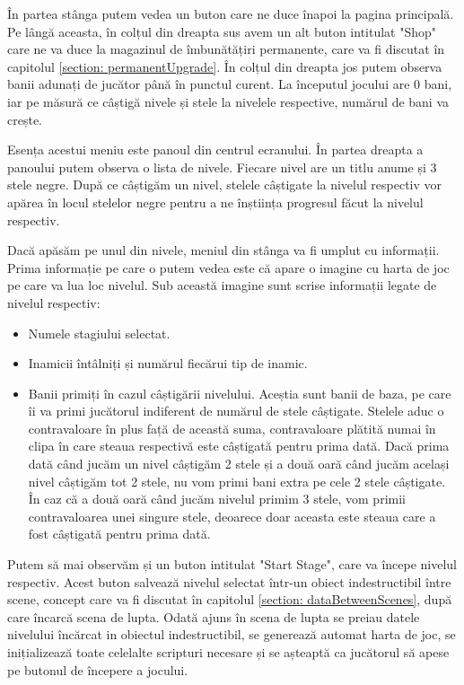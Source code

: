 \documentclass[12pt, a4paper]{article}
\begin{document}
	În partea stânga putem vedea un buton care ne duce înapoi la pagina principală. Pe lângă aceasta, în colțul din dreapta sus avem un alt buton intitulat "Shop" care ne va duce la magazinul de îmbunătățiri permanente, care va fi discutat în capitolul \ref{section: permanentUpgrade}. În colțul din dreapta jos putem observa banii adunați de jucător până în punctul curent. La începutul jocului are 0 bani, iar pe măsură ce câștigă nivele și stele la nivelele respective, numărul de bani va crește.
	\newline
	
	Esența acestui meniu este panoul din centrul ecranului. În partea dreapta a panoului putem observa o lista de nivele. Fiecare nivel are un titlu anume și 3 stele negre. După ce câștigăm un nivel, stelele câștigate la nivelul respectiv vor apărea în locul stelelor negre pentru a ne înștiința progresul făcut la nivelul respectiv.
	\newline
	
	Dacă apăsăm pe unul din nivele, meniul din stânga va fi umplut cu informații. Prima informație pe care o putem vedea este că apare o imagine cu harta de joc pe care va lua loc nivelul. Sub această imagine sunt scrise informații legate de nivelul respectiv:
	
	\begin{itemize}
		\item Numele stagiului selectat.
		\item Inamicii întâlniți și numărul fiecărui tip de inamic.
		\item Banii primiți în cazul câștigării nivelului. Aceștia sunt banii de baza, pe care îi va primi jucătorul indiferent de numărul de stele câștigate. Stelele aduc o contravaloare în plus față de această suma, contravaloare plătită numai în clipa în care steaua respectivă este câștigată pentru prima dată. Dacă prima dată când jucăm un nivel câștigăm 2 stele și a două oară când jucăm același nivel câștigăm tot 2 stele, nu vom primi bani extra pe cele 2 stele câștigate. În caz că a două oară când jucăm nivelul primim 3 stele, vom primii contravaloarea unei singure stele, deoarece doar aceasta este steaua care a fost câștigată pentru prima dată.
	\end{itemize}
	
	Putem să mai observăm și un buton intitulat "Start Stage", care va începe nivelul respectiv. Acest buton salvează nivelul selectat într-un obiect indestructibil între scene, concept care va fi discutat în capitolul \ref{section: dataBetweenScenes}, după care încarcă scena de lupta. Odată ajuns în scena de lupta se preiau datele nivelului încărcat in obiectul indestructibil, se generează automat harta de joc, se inițializează toate celelalte scripturi necesare și se așteaptă ca jucătorul să apese pe butonul de începere a jocului.
	\newline
	
\end{document}
